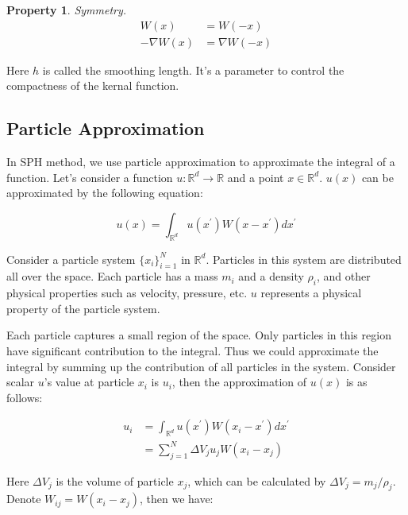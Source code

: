 \documentclass[10pt, oneside]{article}
\newcommand{\R}{\mathbb{R}}
\newtheorem{property}{Property} %
\begin{document}
\begin{property}
    Symmetry.
    \begin{equation}
        \begin{aligned}
            W(x) &= W(-x)\\
            -\nabla W(x) &= \nabla W(-x)
        \end{aligned}
    \end{equation}
\end{property}

Here $h$ is called the smoothing length. 
It's a parameter to control the compactness of the kernal function.

\subsection{Particle Approximation}

In SPH method, we use particle approximation to approximate the integral of a function. 
Let's consider a function $u: \R^d \to \R$ and a point $x \in \R^d$.
$u(x)$ can be approximated by the following equation:

\begin{equation}
    u(x) = \int_{\R^d} u(x^\prime) W(x-x^\prime) dx^\prime
\end{equation}

Consider a particle system $\{x_i\}_{i=1}^N$ in $\R^d$. 
Particles in this system are distributed all over the space. 
Each particle has a mass $m_i$ and a density $\rho_i$, 
and other physical properties such as velocity, pressure, etc. 
$u$ represents a physical property of the particle system.

Each particle captures a small region of the space. 
Only particles in this region have significant contribution to the integral.
Thus we could approximate the integral by summing up the contribution of all particles in the system.
Consider scalar $u$'s value at particle $x_i$ is $u_i$, 
then the approximation of $u(x)$ is as follows:

\begin{equation}
    \begin{aligned}
        u_i &= \int_{\R^d} u(x^\prime) W(x_i-x^\prime) dx^\prime\\
        &= \sum_{j=1}^{N} \Delta V_j u_j W(x_i-x_j)
    \end{aligned}
\end{equation}

Here $\Delta V_j$ is the volume of particle $x_j$, 
which can be calculated by $\Delta V_j = m_j / \rho_j$. 
Denote $W_{ij} = W(x_i-x_j)$, then we have:
\end{document}
